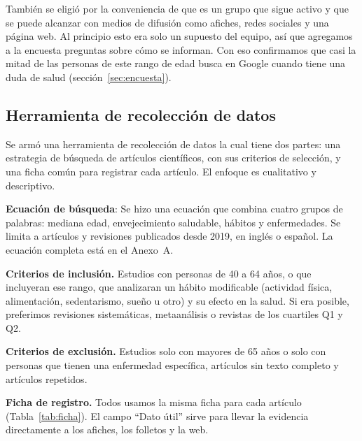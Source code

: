 \documentclass[12pt, letterpaper, table, xcdraw]{extarticle}
\begin{document}
También se eligió por la conveniencia de que es un grupo que sigue activo y que se puede alcanzar con medios de difusión como afiches, redes sociales y una página web. Al principio esto era solo un supuesto del equipo, así que agregamos a la encuesta preguntas sobre cómo se informan. Con eso confirmamos que casi la mitad de las personas de este rango de edad busca en Google cuando tiene una duda de salud (sección~\ref{sec:encuesta}).

\subsection{Herramienta de recolección de datos}

Se armó una herramienta de recolección de datos la cual tiene dos partes: una estrategia de búsqueda de artículos científicos, con sus criterios de selección, y una ficha común para registrar cada artículo. El enfoque es cualitativo y descriptivo. 

\textbf{Ecuación de búsqueda}: Se hizo una ecuación que combina cuatro grupos de palabras: mediana edad, envejecimiento saludable, hábitos y enfermedades. Se limita a artículos y revisiones publicados desde 2019, en inglés o español. La ecuación completa está en el Anexo~A. 

\textbf{Criterios de inclusión.} Estudios con personas de 40 a 64 años, o que incluyeran ese rango, que analizaran un hábito modificable (actividad física, alimentación, sedentarismo, sueño u otro) y su efecto en la salud. Si era posible, preferimos revisiones sistemáticas, metaanálisis o revistas de los cuartiles Q1 y Q2.

\textbf{Criterios de exclusión.} Estudios solo con mayores de 65 años o solo con personas que tienen una enfermedad específica, artículos sin texto completo y artículos repetidos.

\textbf{Ficha de registro.} Todos usamos la misma ficha para cada artículo (Tabla~\ref{tab:ficha}). El campo ``Dato útil'' sirve para llevar la evidencia directamente a los afiches, los folletos y la web.
\end{document}
